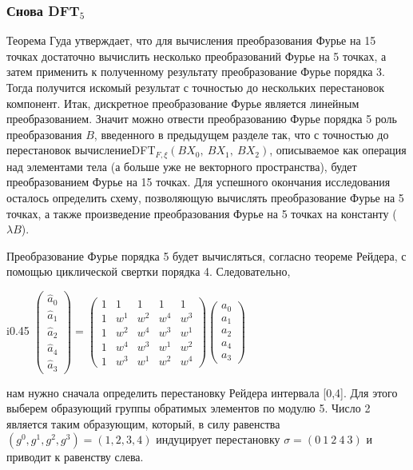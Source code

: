 \documentclass{mai_book}
\begin{document}
\subsubsection{Снова D{\footnotesize FT}$_5$}
Теорема Гуда утверждает, что для вычисления преобразования Фурье на 15 точках достаточно вычислить несколько преобразований Фурье на 5 точках, а затем применить к полученному результату преобразование Фурье порядка 3. Тогда получится искомый результат с точностью до нескольких перестановок компонент. Итак, дискретное преобразование Фурье является линейным преобразованием. Значит можно отвести преобразованию Фурье порядка 5 роль преобразования $B$, введенного в предыдущем разделе так, что с точностью до перестановок вычисление\linebreak D{\footnotesize FT}$_{F, \xi}(BX_0,\ BX_1,\ BX_2)$, описываемое как операция над элементами тела (а больше уже не векторного пространства), будет преобразованием Фурье на 15 точках. Для успешного окончания исследования осталось определить схему, позволяющую вычислять преобразование Фурье на 5 точках, а также произведение преобразования Фурье на 5 точках на константу ($\lambda B$).\par 
Преобразование Фурье порядка 5 будет вычисляться, согласно теореме Рейдера, с помощью циклической свертки порядка 4. Следовательно,\begin{wrapfigure}{i}{0.45\textwidth}
$\begin{pmatrix} \hat{a}_0 \\ \hat{a}_1 \\ \hat{a}_2 \\ \hat{a}_4 \\ \hat{a}_3 \end{pmatrix} = \begin{pmatrix} 1 & 1 & 1 & 1 & 1 \\ 1 & w^1 & w^2 & w^4 & w^3 \\ 1 & w^2 & w^4 & w^3 & w^1 \\ 1 & w^4 & w^3 & w^1 & w^2 \\ 1 & w^3 & w^1 & w^2 & w^4 \end{pmatrix} \begin{pmatrix} a_0 \\ a_1 \\ a_2 \\ a_4 \\ a_3 \end{pmatrix}$
\end{wrapfigure} нам нужно сначала определить перестановку Рейдера интервала [0,4]. Для этого выберем  образующий группы обратимых элементов по модулю 5. Число 2 является таким образующим, который, в силу равенства $(g^0,g^1,g^2,g^3)=(1,2,3,4)$ индуцирует перестановку $\sigma = (0\ 1\ 2\ 4\ 3)$ и приводит к равенству слева.\par
\end{document}

